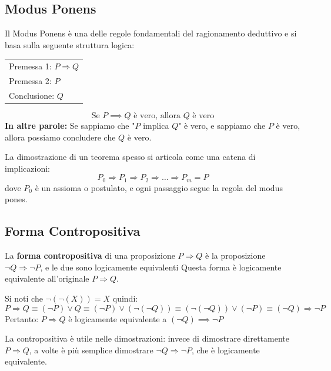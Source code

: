 \subsection{Modus Ponens}

Il Modus Ponens è una delle regole fondamentali del ragionamento deduttivo e si basa sulla seguente   struttura logica:
\begin{center}
\begin{tabular}{l}
  Premessa 1: \( P \Rightarrow Q \) \\
  Premessa 2: \( P \) \\
  \hline
  Conclusione: \( Q \)
\end{tabular}
\end{center}

\[
  \text{Se }  P \implies Q \text{  è vero, allora } Q \text{ è vero}
\]
\textbf{In altre  parole:} Se sappiamo che "\(P\) implica \(Q\)" è vero, e sappiamo che \(P\) è vero, allora possiamo concludere che \(Q\) è vero.
\medskip

\noindent La dimostrazione di un teorema spesso si articola come  una catena di implicazioni:
\[
P_0 \Rightarrow P_1 \Rightarrow P_2 \Rightarrow \dots \Rightarrow P_m = P
\]
dove \(P_0\) è un assioma o postulato, e ogni passaggio segue la regola del modus pones. 


\subsection{Forma Contropositiva}




La \textbf{forma contropositiva} di una proposizione \(P \Rightarrow Q\) è la proposizione \(\neg Q \Rightarrow \neg P\), e le due sono logicamente equivalenti
Questa forma è logicamente equivalente all'originale \(P \Rightarrow Q\).
\begin{esempio}
    Si noti che $ \neg  (\neg (X)) = X $ quindi:
\[
    P \Rightarrow Q \equiv (\neg P) \lor Q \equiv (\neg P )\lor (\neg(\neg Q)) \equiv (\neg(\neg Q)) \lor (\neg P ) \equiv (\neg Q) \Rightarrow \neg P
    \]
    Pertanto:
    \( P \Rightarrow Q\) è logicamente equivalente a \( (\neg Q) \implies \neg P\)
\end{esempio}




\begin{osservazione}
   La contropositiva è utile nelle dimostrazioni: invece di dimostrare direttamente \(P \Rightarrow Q\), a volte è più semplice dimostrare \(\neg Q \Rightarrow \neg P\), che è logicamente equivalente.
\end{osservazione}






